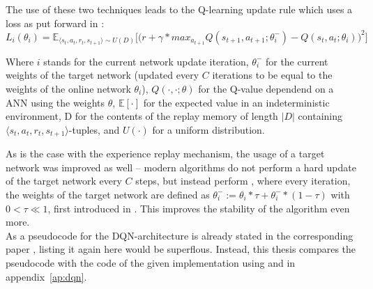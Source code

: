 \noindent The use of these two techniques leads to the Q-learning update rule which uses a loss as put forward in \cite{mnih_human-level_2015}:
\begin{equation} \label{qloss_target}
	L_i(\theta_i) = \mathds{E}_{\langle s_t,a_t,r_t,s_{t+1} \rangle \sim U(D)} \Bigg[\Big( r + \gamma * max_{a_{t+1}} Q(s_{t+1}, a_{t+1}; \theta^-_i) - Q(s_t,a_t;\theta_i) \Big)^2\Bigg]
\end{equation}
\begin{flushright}
	\scriptsize
	Where $i$ stands for the current network update iteration, $\theta_i^-$ for the current weights of the target network (updated every $C$ iterations to be equal to the weights of the online network $\theta_i$), $Q(\cdot,\cdot;\theta)$ for the Q-value dependend on a ANN using the weights $\theta$, $\mathds{E}[\cdot]$ for the expected value in an indeterministic environment, D for the contents of the replay memory of length $\lvert D \rvert$ containing $\langle s_t,a_t,r_t,s_{t+1} \rangle$-tuples, and $U(\cdot)$ for a uniform distribution.
\end{flushright}
As is the case with the experience replay mechanism, the usage of a target network was improved as well -- modern algorithms do not perform a hard update of the target network every $C$ steps, but instead perform , where every iteration, the weights of the target network are defined as $\theta^-_i := \theta_i * \tau + \theta^-_i * (1-\tau)$ with $0 < \tau \ll 1$, first introduced in \cite{lillicrap_continuous_2015}. This improves the stability of the algorithm even more.\\

As a pseudocode for the DQN-architecture is already stated in the corresponding paper \cite{mnih_human-level_2015}, listing it again here would be superflous. Instead, this thesis compares the pseudocode with the code of the given implementation using  and  in appendix~\ref{ap:dqn}. 

